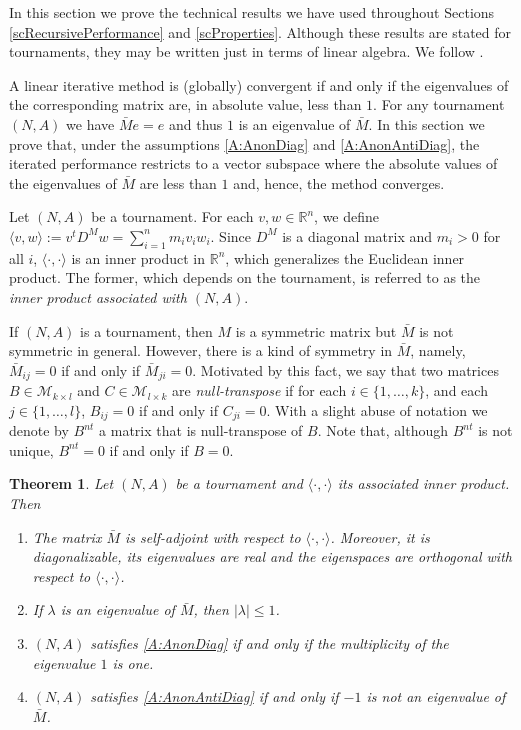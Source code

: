 \documentclass[a4paper,10pt]{article}
\newtheorem{theorem}{Theorem}
\theoremstyle{remark}
\providecommand{\abs}[1]{\lvert#1\rvert}
\newcommand{\TM}{A} %
\newcommand{\MM}{M} %
\newcommand{\DM}{D^\MM} %
\newcommand{\MS}{\mathcal M} %
\begin{document}
In this section we prove the technical results we have used
throughout Sections \ref{scRecursivePerformance} and
\ref{scProperties}. Although these results are stated for
tournaments, they may be written just in terms of linear algebra.
We follow \cite{Ciarlet:1989}.

A linear iterative method is (globally) convergent if and only if the
eigenvalues of the corresponding matrix are, in absolute value,
less than $1$. For any tournament $(N,\TM)$ we have $\bar{\MM}e=e$
and thus $1$ is an eigenvalue of $\bar{\MM}$. In this section we
prove that, under the assumptions \ref{A:AnonDiag} and
\ref{A:AnonAntiDiag}, the iterated performance restricts to a
vector subspace where the absolute values of the eigenvalues of
$\bar{\MM}$ are less than $1$ and, hence, the method converges.

Let $(N,\TM)$ be a tournament. For each $v,w\in\mathbb{R}^n$, we
define $\langle v,w\rangle:=v^t \DM w=\sum_{i=1}^n m_i v_i w_i$. Since $\DM$ is a diagonal
matrix and $m_i>0$ for all $i$, $\langle\cdot,\cdot\rangle$ is an
inner product in $\mathbb{R}^n$, which generalizes the Euclidean
inner product. The former, which depends on the tournament, is
referred to as the \emph{inner product associated with $(N,\TM)$}.

If $(N,\TM)$ is a tournament, then $\MM$ is a symmetric matrix but
$\bar {\MM}$ is not symmetric in general. However, there is a kind
of symmetry in $\bar {\MM}$, namely, $\bar {\MM}_{ij}=0$ if and
only if $\bar {\MM}_{ji}=0$. Motivated by this fact, we say that
two matrices $B\in \MS_{k\times l}$ and $C\in \MS_{l\times k}$ are
\emph{null-transpose} if for each $i \in \{1,\ldots,k\}$, and each
$j \in \{1,\ldots,l\}$, $B_{ij}=0$ if and only if $C_{ji}=0$. With
a slight abuse of notation we denote by $B^{nt}$ a matrix that is
null-transpose of $B$. Note that, although $B^{nt}$ is not unique,
$B^{nt}=0$ if and only if $B=0$.


\begin{theorem}\label{teor:bound-eigenvalues:generalized}
Let $(N,\TM)$ be a tournament and $\langle\cdot,\cdot\rangle$ its
associated  inner product. Then
\begin{enumerate}

\item The matrix $\bar {\MM}$ is self-adjoint with respect to
$\langle\cdot,\cdot\rangle$. Moreover, it is diagonalizable, its
eigenvalues are real and the eigenspaces are orthogonal with
respect to $\langle\cdot,\cdot\rangle$.

\item If $\lambda$ is an eigenvalue of $\bar {\MM}$, then
$\abs{\lambda}\leq 1$.

\item $(N,\TM)$ satisfies \ref{A:AnonDiag} if and only if the
multiplicity of the eigenvalue $1$ is one.

\item $(N,\TM)$ satisfies \ref{A:AnonAntiDiag} if and only if $-1$
is not an eigenvalue of $\bar {\MM}$.
\end{enumerate}
\end{theorem}
\end{document}
